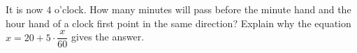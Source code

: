 It is now $4$ o'clock. How many minutes will pass before the minute hand and the hour hand of a clock first point in the same direction? Explain why the equation $x=20+5\cdot\dfrac{x}{60}$ gives the answer.
